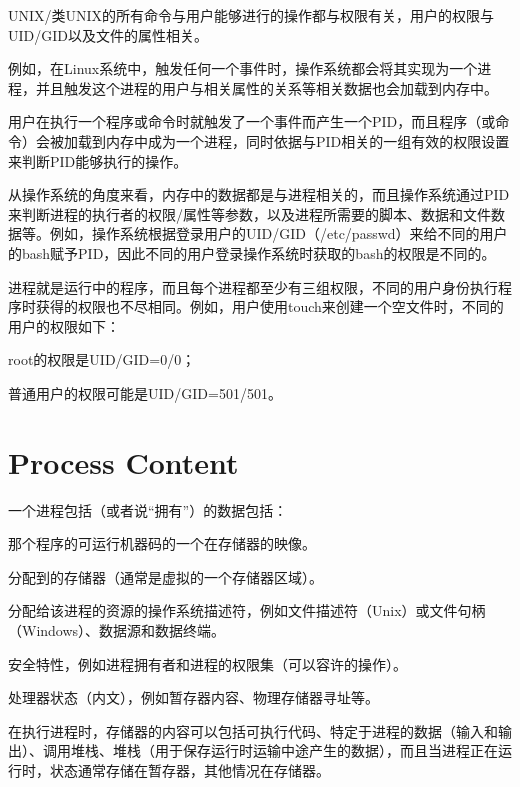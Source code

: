 UNIX/类UNIX的所有命令与用户能够进行的操作都与权限有关，用户的权限与UID/GID以及文件的属性相关。

例如，在Linux系统中，触发任何一个事件时，操作系统都会将其实现为一个进程，并且触发这个进程的用户与相关属性的关系等相关数据也会加载到内存中。

用户在执行一个程序或命令时就触发了一个事件而产生一个PID，而且程序（或命令）会被加载到内存中成为一个进程，同时依据与PID相关的一组有效的权限设置来判断PID能够执行的操作。


从操作系统的角度来看，内存中的数据都是与进程相关的，而且操作系统通过PID来判断进程的执行者的权限/属性等参数，以及进程所需要的脚本、数据和文件数据等。例如，操作系统根据登录用户的UID/GID（/etc/passwd）来给不同的用户的bash赋予PID，因此不同的用户登录操作系统时获取的bash的权限是不同的。

进程就是运行中的程序，而且每个进程都至少有三组权限，不同的用户身份执行程序时获得的权限也不尽相同。例如，用户使用touch来创建一个空文件时，不同的用户的权限如下：

\begin{compactitem}
\item root的权限是UID/GID=0/0；
\item 普通用户的权限可能是UID/GID=501/501。
\end{compactitem}


\section{Process Content}

一个进程包括（或者说“拥有”）的数据包括：

\begin{compactitem}
\item 那个程序的可运行机器码的一个在存储器的映像。
\item 分配到的存储器（通常是虚拟的一个存储器区域）。
\item 分配给该进程的资源的操作系统描述符，例如文件描述符（Unix）或文件句柄（Windows）、数据源和数据终端。
\item 安全特性，例如进程拥有者和进程的权限集（可以容许的操作）。
\item 处理器状态（内文），例如暂存器内容、物理存储器寻址等。
\end{compactitem}

在执行进程时，存储器的内容可以包括可执行代码、特定于进程的数据（输入和输出）、调用堆栈、堆栈（用于保存运行时运输中途产生的数据），而且当进程正在运行时，状态通常存储在暂存器，其他情况在存储器。



